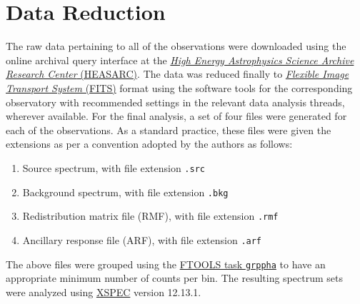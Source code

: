 \section{Data Reduction} \label{sec:reduction-analysis}
    The raw data pertaining to all of the observations were downloaded using the online archival query interface at the %
    \href{https://heasarc.gsfc.nasa.gov/db-perl/W3Browse/w3browse.pl}{\textit{High Energy Astrophysics Science Archive Research Center} (HEASARC)}. The data was reduced finally to %
    \href{https://fits.gsfc.nasa.gov/standard40/fits_standard40aa-le.pdf}{\textit{Flexible Image Transport System} (FITS)} format using the software tools for the corresponding observatory with recommended settings in the relevant data analysis threads, wherever available. For the final analysis, a set of four files were generated for each of the observations. As a standard practice, these files were given the extensions as per a convention adopted by the authors as follows:
    \begin{enumerate}
    	\item Source spectrum, with file extension \texttt{.src}
    	\item Background spectrum, with file extension \texttt{.bkg}
    	\item Redistribution matrix file (RMF), with file extension \texttt{.rmf}
    	\item Ancillary response file (ARF), with file extension \texttt{.arf}
    \end{enumerate}
    The above files were grouped using the %
    \href{https://heasarc.gsfc.nasa.gov/docs/heasarc/caldb/docs/memos/cal_sw_93_010/cal_sw_93_010.pdf}{FTOOLS task \texttt{grppha}} to have an appropriate minimum number of counts per bin. The resulting spectrum sets were analyzed using \href{https://heasarc.gsfc.nasa.gov/xanadu/xspec/}{XSPEC} version 12.13.1.
    
